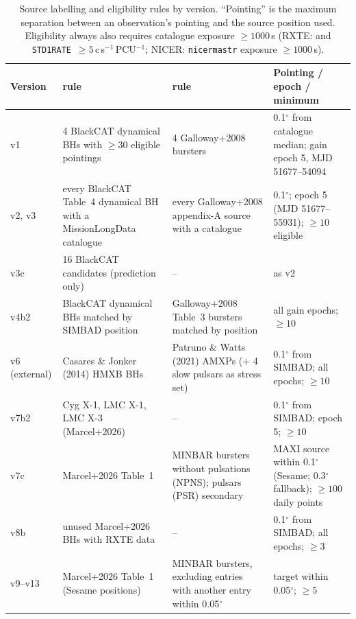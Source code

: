 \begin{table}[htbp]
\centering\small
\caption[Source labelling and eligibility rules by version]{Source labelling and eligibility rules by version.
``Pointing'' is the maximum separation between an observation's pointing and the source position used.
Eligibility always also requires catalogue exposure $\ge 1000$\,s (RXTE: and \texttt{STD1RATE}~$\ge 5$\,c\,s$^{-1}$\,PCU$^{-1}$;
NICER: \texttt{nicermastr} exposure $\ge 1000$\,s).}
\label{tab:labelrules}
\begin{tabularx}{\textwidth}{@{}p{1.6cm}XXp{2.6cm}@{}}
\toprule
Version & \BH{} rule & \NS{} rule & Pointing / epoch / minimum \\
\midrule
v1 & 4 BlackCAT dynamical BHs with $\ge 30$ eligible pointings & 4 Galloway+2008 bursters & 0.1$^\circ$ from catalogue median; gain epoch 5, MJD 51677--54094 \\
v2, v3 & every BlackCAT Table~4 dynamical BH with a MissionLongData catalogue & every Galloway+2008 appendix-A source with a catalogue & 0.1$^\circ$; epoch 5 (MJD 51677--55931); $\ge 10$ eligible \\
v3c & 16 BlackCAT candidates (prediction only) & -- & as v2 \\
v4b2 & BlackCAT dynamical BHs matched by SIMBAD position & Galloway+2008 Table~3 bursters matched by position & all gain epochs; $\ge 10$ \\
v6 (external) & Casares \& Jonker (2014) HMXB BHs & Patruno \& Watts (2021) AMXPs (+ 4 slow pulsars as stress set) & 0.1$^\circ$ from SIMBAD; all epochs; $\ge 10$ \\
v7b2 & Cyg X-1, LMC X-1, LMC X-3 (Marcel+2026) & -- & 0.1$^\circ$ from SIMBAD; epoch 5; $\ge 10$ \\
v7c & Marcel+2026 Table~1 & MINBAR bursters without pulsations (NPNS); pulsars (PSR) secondary & MAXI source within 0.1$^\circ$ (Sesame; 0.3$^\circ$ fallback); $\ge 100$ daily points \\
v8b & unused Marcel+2026 BHs with RXTE data & -- & 0.1$^\circ$ from SIMBAD; all epochs; $\ge 3$ \\
v9--v13 & Marcel+2026 Table~1 (Sesame positions) & MINBAR bursters, excluding entries with another entry within 0.05$^\circ$ & target within 0.05$^\circ$; $\ge 5$ \\
\bottomrule
\end{tabularx}
\end{table}

